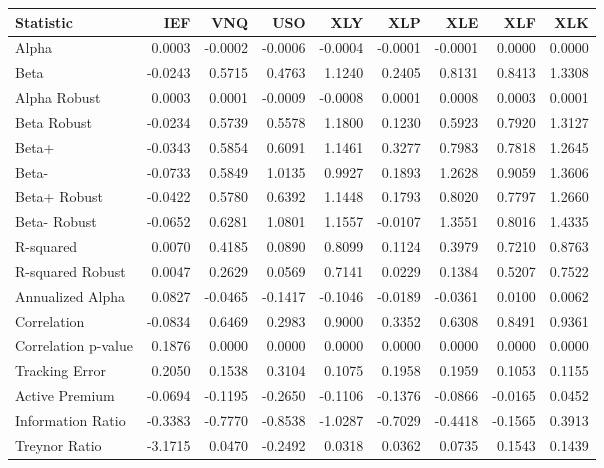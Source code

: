 \begin{tabular}{lrrrrrrrr}
\toprule
Statistic & IEF & VNQ & USO & XLY & XLP & XLE & XLF & XLK \\
\midrule
Alpha & 0.0003 & -0.0002 & -0.0006 & -0.0004 & -0.0001 & -0.0001 & 0.0000 & 0.0000 \\
Beta & -0.0243 & 0.5715 & 0.4763 & 1.1240 & 0.2405 & 0.8131 & 0.8413 & 1.3308 \\
Alpha Robust & 0.0003 & 0.0001 & -0.0009 & -0.0008 & 0.0001 & 0.0008 & 0.0003 & 0.0001 \\
Beta Robust & -0.0234 & 0.5739 & 0.5578 & 1.1800 & 0.1230 & 0.5923 & 0.7920 & 1.3127 \\
Beta+ & -0.0343 & 0.5854 & 0.6091 & 1.1461 & 0.3277 & 0.7983 & 0.7818 & 1.2645 \\
Beta- & -0.0733 & 0.5849 & 1.0135 & 0.9927 & 0.1893 & 1.2628 & 0.9059 & 1.3606 \\
Beta+ Robust & -0.0422 & 0.5780 & 0.6392 & 1.1448 & 0.1793 & 0.8020 & 0.7797 & 1.2660 \\
Beta- Robust & -0.0652 & 0.6281 & 1.0801 & 1.1557 & -0.0107 & 1.3551 & 0.8016 & 1.4335 \\
R-squared & 0.0070 & 0.4185 & 0.0890 & 0.8099 & 0.1124 & 0.3979 & 0.7210 & 0.8763 \\
R-squared Robust & 0.0047 & 0.2629 & 0.0569 & 0.7141 & 0.0229 & 0.1384 & 0.5207 & 0.7522 \\
Annualized Alpha & 0.0827 & -0.0465 & -0.1417 & -0.1046 & -0.0189 & -0.0361 & 0.0100 & 0.0062 \\
Correlation & -0.0834 & 0.6469 & 0.2983 & 0.9000 & 0.3352 & 0.6308 & 0.8491 & 0.9361 \\
Correlation p-value & 0.1876 & 0.0000 & 0.0000 & 0.0000 & 0.0000 & 0.0000 & 0.0000 & 0.0000 \\
Tracking Error & 0.2050 & 0.1538 & 0.3104 & 0.1075 & 0.1958 & 0.1959 & 0.1053 & 0.1155 \\
Active Premium & -0.0694 & -0.1195 & -0.2650 & -0.1106 & -0.1376 & -0.0866 & -0.0165 & 0.0452 \\
Information Ratio & -0.3383 & -0.7770 & -0.8538 & -1.0287 & -0.7029 & -0.4418 & -0.1565 & 0.3913 \\
Treynor Ratio & -3.1715 & 0.0470 & -0.2492 & 0.0318 & 0.0362 & 0.0735 & 0.1543 & 0.1439 \\
\bottomrule
\end{tabular}
